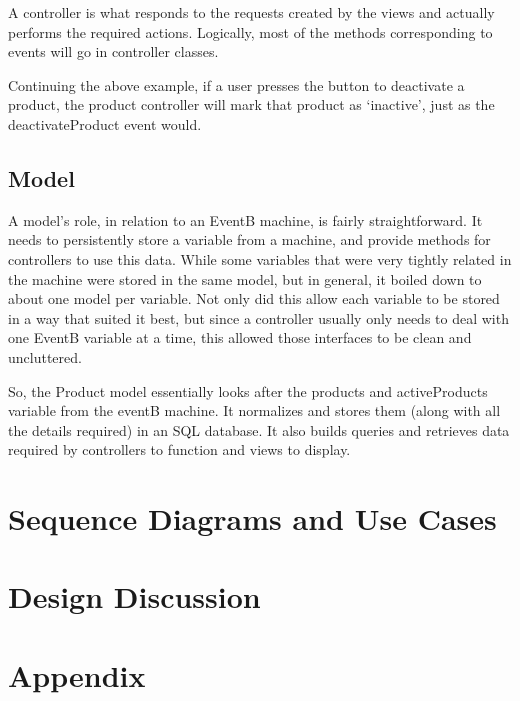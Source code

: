 \documentclass[a4paper]{article}
\begin{document}
A controller is what responds to the requests created by the views and actually performs the required actions. Logically, most of the methods corresponding to events will go in controller classes. 

Continuing the above example, if a user presses the button to deactivate a product, the product controller will mark that product as ‘inactive’, just as the deactivateProduct event would.

\subsection{Model}

A model’s role, in relation to an EventB machine, is fairly straightforward. It needs to persistently store a variable from a machine, and provide methods for controllers to use this data. 
While some variables that were very tightly related in the machine were stored in the same model, but in general, it boiled down to about one model per variable. Not only did this allow each variable to be stored in a way that suited it best, but since a controller usually only needs to deal with one EventB variable at a time, this allowed those interfaces to be clean and uncluttered. 

So, the Product model essentially looks after the products and activeProducts variable from the eventB machine. It normalizes and stores them (along with all the details required) in an SQL database. It also builds queries and retrieves data required by controllers to function and views to display. 
\pagebreak
\section{Sequence Diagrams and Use Cases}

\pagebreak
\section{Design Discussion}

\pagebreak

\section{Appendix}

\appendix
\end{document}
